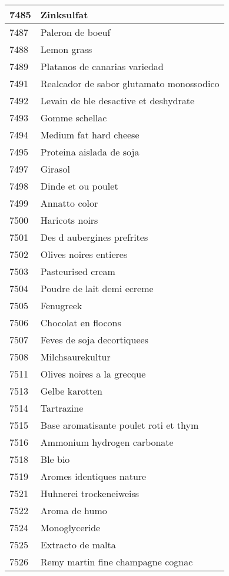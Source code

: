 \begin{longtable}{|l|l|}
7485 & Zinksulfat \\ \hline 
7487 & Paleron de boeuf \\ \hline 
7488 & Lemon grass \\ \hline 
7489 & Platanos de canarias variedad \\ \hline 
7491 & Realcador de sabor glutamato monossodico \\ \hline 
7492 & Levain de ble desactive et deshydrate \\ \hline 
7493 & Gomme schellac \\ \hline 
7494 & Medium fat hard cheese \\ \hline 
7495 & Proteina aislada de soja \\ \hline 
7497 & Girasol \\ \hline 
7498 & Dinde et ou poulet \\ \hline 
7499 & Annatto color \\ \hline 
7500 & Haricots noirs \\ \hline 
7501 & Des d aubergines prefrites \\ \hline 
7502 & Olives noires entieres \\ \hline 
7503 & Pasteurised cream \\ \hline 
7504 & Poudre de lait demi ecreme \\ \hline 
7505 & Fenugreek \\ \hline 
7506 & Chocolat en flocons \\ \hline 
7507 & Feves de soja decortiquees \\ \hline 
7508 & Milchsaurekultur \\ \hline 
7511 & Olives noires a la grecque \\ \hline 
7513 & Gelbe karotten \\ \hline 
7514 & Tartrazine \\ \hline 
7515 & Base aromatisante poulet roti et thym \\ \hline 
7516 & Ammonium hydrogen carbonate \\ \hline 
7518 & Ble bio \\ \hline 
7519 & Aromes identiques nature \\ \hline 
7521 & Huhnerei trockeneiweiss \\ \hline 
7522 & Aroma de humo \\ \hline 
7524 & Monoglyceride \\ \hline 
7525 & Extracto de malta \\ \hline 
7526 & Remy martin fine champagne cognac \\ \hline 

\end{longtable}
